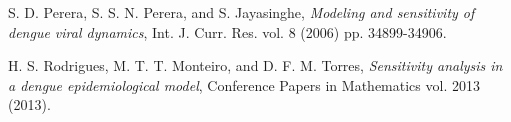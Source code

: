 \documentclass[11pt, oneside]{article}    %
\begin{document}
\begin{thebibliography}{99}
S. D. Perera, S. S. N. Perera, and S. Jayasinghe, {\em Modeling and sensitivity of dengue viral dynamics}, Int. J. Curr. Res. vol. 8 (2006) pp. 34899-34906.

H. S. Rodrigues, M. T. T. Monteiro, and D. F. M. Torres, {\em Sensitivity analysis in a dengue epidemiological model}, Conference Papers in Mathematics vol. 2013 (2013).








\end{thebibliography}
\end{document}
